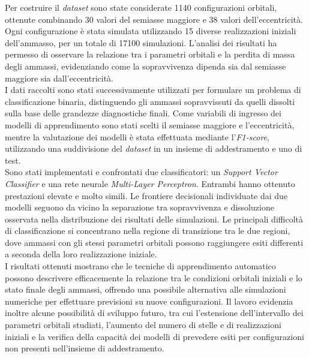\noindent Per costruire il \emph{dataset} sono state considerate 1140 configurazioni orbitali, ottenute combinando 30 valori del semiasse maggiore e 38 valori dell'eccentricità. Ogni configurazione è stata simulata utilizzando 15 diverse realizzazioni iniziali dell'ammasso, per un totale di 17100 simulazioni. L'analisi dei risultati ha permesso di osservare la relazione tra i parametri orbitali e la perdita di massa degli ammassi, evidenziando come la sopravvivenza dipenda sia dal semiasse maggiore sia dall'eccentricità.\\ I dati raccolti sono stati successivamente utilizzati per formulare un problema di classificazione binaria, distinguendo gli ammassi sopravvissuti da quelli dissolti sulla base delle grandezze diagnostiche finali. Come variabili di ingresso dei modelli di apprendimento sono stati scelti il semiasse maggiore e l'eccentricità, mentre la valutazione dei modelli è stata effettuata mediante l'\emph{F1-score}, utilizzando una suddivisione del \emph{dataset} in un insieme di addestramento e uno di test.\\

\noindent Sono stati implementati e confrontati due classificatori: un \emph{Support Vector Classifier} e una rete neurale \emph{Multi-Layer Perceptron}. Entrambi hanno ottenuto prestazioni elevate e molto simili. Le frontiere decisionali individuate dai due modelli seguono da vicino la separazione tra sopravvivenza e dissoluzione osservata nella distribuzione dei risultati delle simulazioni. Le principali difficoltà di classificazione si concentrano nella regione di transizione tra le due regioni, dove ammassi con gli stessi parametri orbitali possono raggiungere esiti differenti a seconda della loro realizzazione iniziale.\\

\noindent I risultati ottenuti mostrano che le tecniche di apprendimento automatico possono descrivere efficacemente la relazione tra le condizioni orbitali iniziali e lo stato finale degli ammassi, offrendo una possibile alternativa alle simulazioni numeriche per effettuare previsioni su nuove configurazioni. Il lavoro evidenzia inoltre alcune possibilità di sviluppo futuro, tra cui l'estensione dell'intervallo dei parametri orbitali studiati, l'aumento del numero di stelle e di realizzazioni iniziali e la verifica della capacità dei modelli di prevedere esiti per configurazioni non presenti nell'insieme di addestramento.